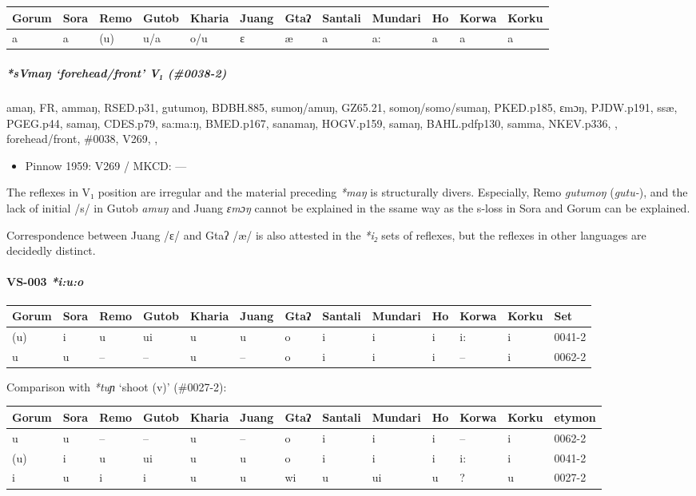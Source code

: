 \documentclass[a4paper,]{article}
\providecommand{\tightlist}{%
  \setlength{\itemsep}{0pt}\setlength{\parskip}{0pt}}
\let\oldparagraph\paragraph
\renewcommand{\paragraph}[1]{\oldparagraph{#1}\mbox{}}
\let\oldsubparagraph\subparagraph
\renewcommand{\subparagraph}[1]{\oldsubparagraph{#1}\mbox{}}
\begin{document}
\begin{longtable}[]{@{}llllllllllll@{}}
\toprule
Gorum & Sora & Remo & Gutob & Kharia & Juang & Gtaʔ & Santali & Mundari
& Ho & Korwa & Korku\tabularnewline
\midrule
\endhead
a & a & (u) & u/a & o/u & ɛ & æ & a & a: & a & a & a\tabularnewline
\bottomrule
\end{longtable}

\subparagraph{\texorpdfstring{\emph{*sVmaŋ} `forehead/front' V₁
(\#0038-2)}{*sVmaŋ forehead/front V₁ (\#0038-2)}}\label{svmaux14b-foreheadfront-v-0038-2}

amaŋ, FR, ammaŋ, RSED.p31, gutumoŋ, BDBH.885, sumoŋ/amuŋ, GZ65.21,
somoŋ/somo/sumaŋ, PKED.p185, ɛmɔŋ, PJDW.p191, ssæ, PGEG.p44, samaŋ,
CDES.p79, sa:ma:ŋ, BMED.p167, sanamaŋ, HOGV.p159, samaŋ, BAHL.pdfp130,
samma, NKEV.p336, , forehead/front, \#0038, V269, ,

\begin{itemize}
\tightlist
\item
  Pinnow 1959: V269 / MKCD: ---
\end{itemize}

The reflexes in V₁ position are irregular and the material preceding
\emph{*maŋ} is structurally divers. Especially, Remo \emph{gutumoŋ}
(\emph{gutu-}), and the lack of initial /s/ in Gutob \emph{amuŋ} and
Juang \emph{ɛmɔŋ} cannot be explained in the ssame way as the s-loss in
Sora and Gorum can be explained.

Correspondence between Juang /ɛ/ and Gtaʔ /æ/ is also attested in the
\emph{*i₂} sets of reflexes, but the reflexes in other languages are
decidedly distinct.

\paragraph{\texorpdfstring{VS-003
\emph{*i:u:o}}{VS-003 *i:u:o}}\label{vs-003-iuo}

\begin{longtable}[]{@{}lllllllllllll@{}}
\toprule
Gorum & Sora & Remo & Gutob & Kharia & Juang & Gtaʔ & Santali & Mundari
& Ho & Korwa & Korku & Set\tabularnewline
\midrule
\endhead
(u) & i & u & ui & u & u & o & i & i & i & i: & i &
0041-2\tabularnewline
u & u & -- & -- & u & -- & o & i & i & i & -- & i &
0062-2\tabularnewline
\bottomrule
\end{longtable}

Comparison with \emph{*tuɲ} `shoot (v)' (\#0027-2):

\begin{longtable}[]{@{}lllllllllllll@{}}
\toprule
Gorum & Sora & Remo & Gutob & Kharia & Juang & Gtaʔ & Santali & Mundari
& Ho & Korwa & Korku & etymon\tabularnewline
\midrule
\endhead
u & u & -- & -- & u & -- & o & i & i & i & -- & i &
0062-2\tabularnewline
(u) & i & u & ui & u & u & o & i & i & i & i: & i &
0041-2\tabularnewline
i & u & i & i & u & u & wi & u & ui & u & ? & u & 0027-2\tabularnewline
\bottomrule
\end{longtable}
\end{document}
